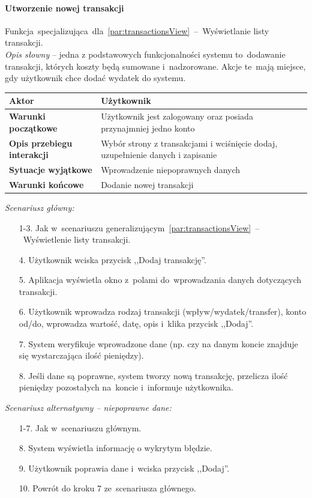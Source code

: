 \paragraph{Utworzenie nowej transakcji\newline}
\label{par:transactionCreate}
Funkcja~specjalizująca~dla~\ref{par:transactionsView}~--~Wyświetlanie listy transakcji.\\

\textit{Opis słowny} -- jedna z podstawowych funkcjonalności systemu to~dodawanie transakcji, których koszty będą sumowane i~nadzorowane. Akcje te~mają miejsce, gdy użytkownik chce dodać wydatek do systemu.

\begin{longtable}{|p{5cm}|p{7cm}|}
  \hline \textbf{Aktor} & Użytkownik \\
  \hline \textbf{Warunki początkowe} & Użytkownik jest zalogowany oraz posiada przynajmniej jedno konto \\
  \hline \textbf{Opis przebiegu interakcji} & Wybór strony z transakcjami i wciśnięcie dodaj, uzupełnienie danych i zapisanie \\
  \hline \textbf{Sytuacje wyjątkowe} & Wprowadzenie niepoprawnych danych \\
  \hline \textbf{Warunki końcowe} & Dodanie nowej transakcji \\
  \hline
\end{longtable}

\noindent \textit{Scenariusz główny:}
\begin{enumerate}
  \item[1-3.] Jak w~scenariuszu generalizującym~\ref{par:transactionsView}~--~Wyświetlenie listy transakcji.
  \item[4.] Użytkownik wciska przycisk ,,Dodaj transakcję''.
  \item[5.] Aplikacja wyświetla okno z~polami do~wprowadzania danych dotyczących transakcji.
  \item[6.] Użytkownik wprowadza rodzaj transakcji (wpływ/wydatek/transfer), konto od/do, wprowadza wartość, datę, opis i~klika przycisk ,,Dodaj''.
  \item[7.] System weryfikuje wprowadzone dane (np. czy na danym koncie znajduje się wystarczająca ilość pieniędzy).
  \item[8.] Jeśli dane są poprawne, system tworzy nową transakcję, przelicza ilość pieniędzy pozostałych na~koncie i~informuje użytkownika.
\end{enumerate}

\noindent \textit{Scenariusz alternatywny -- niepoprawne dane:}
\begin{enumerate}
  \item[1-7.] Jak w~scenariuszu głównym.
  \item[8.] System wyświetla informację o wykrytym błędzie.
  \item[9.] Użytkownik poprawia dane i~wciska przycisk ,,Dodaj''.
  \item[10.] Powrót do kroku 7 ze~scenariusza głównego.
\end{enumerate}

